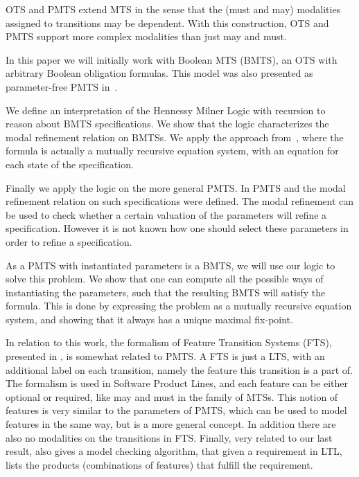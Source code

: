 OTS and PMTS extend MTS in the sense that the (must and may) modalities assigned to transitions may be dependent.
With this construction, OTS and PMTS support more complex modalities than just may and must.
 
In this paper we will initially work with Boolean MTS (BMTS), an OTS with arbitrary Boolean obligation formulas. This model was also presented as parameter-free PMTS in~\cite{BKLMS:ATVA:11}.

We define an interpretation of the Hennessy Milner Logic with recursion \cite{DBLP:conf/caap/Larsen88} to reason about BMTS specifications. We show that the logic characterizes the modal refinement relation on BMTSs. We apply the approach from~\cite{DBLP:journals/iandc/SteffenI94}, where the formula is actually a mutually recursive equation system, with an equation for each state of the specification.

Finally we apply the logic on the more general PMTS. In \cite{BKLMS:ATVA:11} PMTS and the modal refinement relation on such specifications were defined. The modal refinement can be used to check whether a certain valuation of the parameters will refine a specification. However it is not known how one should select these parameters in order to refine a specification.

As a PMTS with instantiated parameters is a BMTS, we will use our logic to solve this problem. We show that one can compute all the possible ways of instantiating the parameters, such that the resulting BMTS will satisfy the formula.
This is done by expressing the problem as a mutually recursive equation system, and showing that it always has a unique maximal fix-point.

In relation to this work, the formalism of Feature Transition Systems (FTS), presented in \cite{Classen2010}, is somewhat related to PMTS. A FTS is just a LTS, with an additional label on each transition, namely the feature this transition is a part of. The formalism is used in Software Product Lines, and each feature can be either optional or required, like may and must in the family of MTSs. This notion of features is very similar to the parameters of PMTS, which can be used to model features in the same way, but is a more general concept. In addition there are also no modalities on the transitions in FTS. Finally, very related to our last result, \cite{Classen2010} also gives a model checking algorithm, that given a requirement in LTL, lists the products (combinations of features) that fulfill the requirement. 

